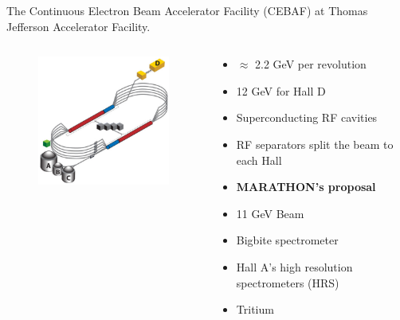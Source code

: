 \documentclass[12pt]{beamer}
\begin{document}
\begin{frame}
The Continuous Electron Beam Accelerator Facility (CEBAF) at Thomas Jefferson Accelerator Facility.\\

\vspace{-10pt}
\begin{columns}[c]
		\begin{figure}
			\includegraphics[width=5.5cm]{../images/cebaf.pdf}
		\end{figure}
		\begin{block}{}
			\begin{itemize}
				\addtolength{\itemindent}{-1em}
				\item $\approx$ 2.2 GeV per revolution
				\item 12 GeV for Hall D
				\item Superconducting RF cavities
				\item RF separators split the beam to each Hall
				\item [] \hspace{-15pt}\textbf{MARATHON's proposal }
				\item 11 GeV Beam	
				\item Bigbite spectrometer
				\item Hall A's high resolution spectrometers (HRS)
				\item Tritium
			\end{itemize}
		\end{block}
\end{columns}
\end{frame}
\end{document}
